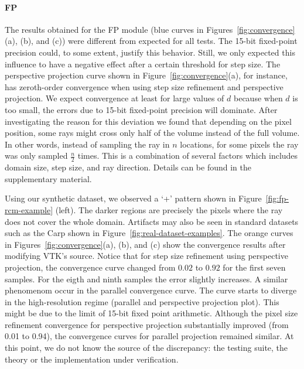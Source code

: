 \paragraph*{FP}
The results obtained for the FP module (blue curves in
Figures~\ref{fig:convergence}(a), (b), and (c)) were different from
expected for all tests. The 15-bit fixed-point precision could, to
some extent, justify this behavior. Still, we only expected this
influence to have a negative effect after a certain threshold for step
size. The perspective projection curve shown in
Figure~\ref{fig:convergence}(a), for instance, has zeroth-order
convergence when using step size refinement and perspective
projection. We expect convergence at least for large values of $d$
because when $d$ is too small, the errors due to 15-bit fixed-point
precision will dominate.
After investigating the reason for this deviation we found that
depending on the pixel position, some rays might cross only half of
the volume instead of the full volume. In other words, instead of
sampling the ray in $n$ locations, for some pixels the ray was only
sampled $\frac{n}{2}$ times. This is a combination of several factors
which includes domain size, step size, and ray direction. Details 
can be found in the supplementary material.

Using our synthetic dataset, we observed a `+' pattern shown in
Figure~\ref{fig:fp-rcm-example} (left). The darker regions are
precisely the pixels where the ray does not cover the whole
domain. Artifacts may also be seen in standard datasets such as the
Carp shown in Figure~\ref{fig:real-dataset-examples}.  The orange
curves in Figures~\ref{fig:convergence}(a), (b), and (c) show the
convergence results after modifying VTK's source.  Notice that for
step size refinement using perspective projection, the convergence
curve changed from $0.02$ to $0.92$ for the first seven samples. For the eigth 
and ninth samples the error slightly increases. A similar phenomenom occur
in the parallel convergence curve. The curve starts to
diverge in the high-resolution regime (parallel and perspective projection plot).
This might be due to the limit of 15-bit fixed point arithmetic.  Although 
the  pixel size refinement convergence for perspective projection substantially improved 
(from 0.01 to 0.94), the convergence curves for parallel projection remained similar. 
At this point, we do not know the source
of the discrepancy: the testing suite, the theory or the
implementation under verification.

